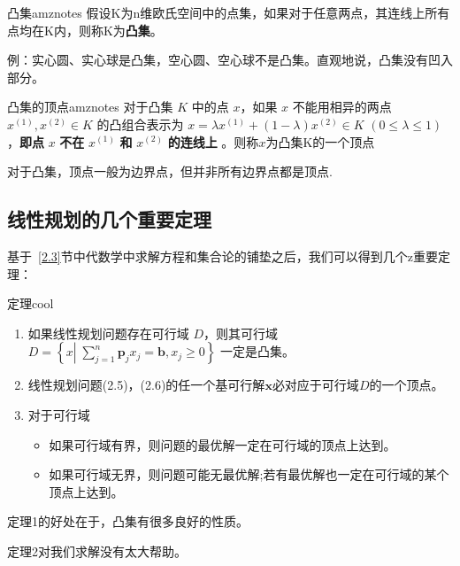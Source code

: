    \begin{dfnbox}{凸集}{amznotes}
        假设K为n维欧氏空间中的点集，如果对于任意两点，其连线上所有点均在K内，则称K为\textbf{凸集}。
    \end{dfnbox}
    例：实心圆、实心球是凸集，空心圆、空心球不是凸集。直观地说，凸集没有凹入部分。
    \begin{dfnbox}{凸集的顶点}{amznotes}
        对于凸集 $K$ 中的点 $x$，如果 $x$ 不能用相异的两点 $x^{(1)}, x^{(2)} \in K$ 的凸组合表示为
$x = \lambda x^{(1)} + (1 - \lambda) x^{(2)} \in K$ \quad $(0 \leq \lambda \leq 1)$，\textbf{即点} $x$ \textbf{不在} $x^{(1)}$ \textbf{和} $x^{(2)}$ \textbf{的连线上} 。则称$x$为凸集K的一个顶点
    \end{dfnbox}
    对于凸集，顶点一般为边界点，但并非所有边界点都是顶点.
    

    \subsection{线性规划的几个重要定理}
    基于~\ref{2.3}节中代数学中求解方程和集合论的铺垫之后，我们可以得到几个z重要定理：
    \begin{thmbox}{定理}{cool}
        \begin{enumerate}
            \item 如果线性规划问题存在可行域 $D$，则其可行域 $D = \left\{ x \left| \; \sum_{j=1}^n \mathbf{p}_j x_j = \mathbf{b}, x_j \geq 0 \right. \right\}$ 一定是凸集。
            \item 线性规划问题(2.5)，(2.6)的任一个基可行解$\mathbf{x}$必对应于可行域$D$的一个顶点。
            \item 对于可行域
            \begin{itemize}
                \item 如果可行域有界，则问题的最优解一定在可行域的顶点上达到。
                \item 如果可行域无界，则问题可能无最优解;若有最优解也一定在可行域的某个顶点上达到。
            \end{itemize}
        \end{enumerate}
    \end{thmbox}
        定理1的好处在于，凸集有很多良好的性质。

        定理2对我们求解没有太大帮助。

